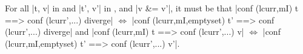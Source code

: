 \begin{theorem}[Equivalence]
For all |t, v| in \lio{} and |t', v'| in \liofs{},
and |v &= v'|, it must be that
%
|conf (lcurr,mI) t  ==> conf (lcurr',...) diverge| $\Leftrightarrow$
|conf (lcurr,mI,emptyset) t' ==> conf (lcurr',...) diverge| and 
%
|conf (lcurr,mI) t  ==> conf (lcurr',...) v| $\Leftrightarrow$
|conf (lcurr,mI,emptyset) t' ==> conf (lcurr',...) v'|.
\end{theorem}
